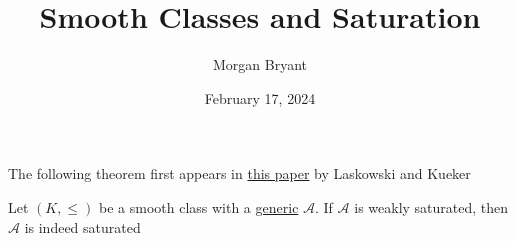 \documentclass[a4paper]{article}
\title{Smooth Classes and Saturation}
\date{February 17, 2024}
\author{Morgan Bryant}
\begin{document}
\maketitle
\par{The following theorem first appears in \href{}{this paper} by Laskowski and Kueker}\par{Let \((K,  \leq )\) be a smooth class with a \href{}{generic} \(\mathcal {A}\). If \(\mathcal {A}\) is weakly saturated, then \(\mathcal {A}\) is indeed saturated}
\printbibliography
\end{document}
